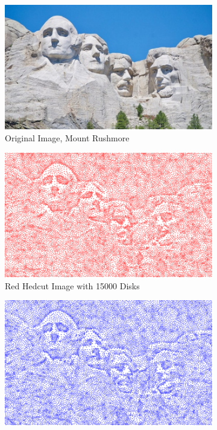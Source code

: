\documentclass[11pt]{article}
\begin{document}
\begin{figure}[H]
	\centering
	\begin{subfigure}[b]{.48\linewidth}
		\includegraphics[width=\linewidth]{Mount-Rushmore}
		\caption{Original Image, Mount Rushmore}
		\label{fig:mountRushmore}
	\end{subfigure}
	\begin{subfigure}[b]{.48\linewidth}
		\includegraphics[width=\linewidth]{Mount-Rushmore-Red-15000}
		\caption{Red Hedcut Image with 15000 Disks}
		\label{fig:mountRusmoreRed}
	\end{subfigure}
	\begin{subfigure}[b]{.48\linewidth}
		\includegraphics[width=\linewidth]{Mount-Rushmore-Blue-15000}

\end{subfigure}
\end{figure}
\end{document}
